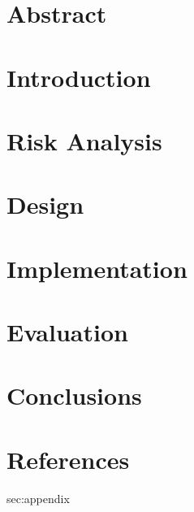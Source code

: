 \documentclass[11pt]{article}
\begin{document}

\clearpage

\onehalfspacing{}

\section*{Abstract}
\label{sec:abstract}

\clearpage

\tableofcontents
\clearpage

\section{Introduction}
\label{sec:intro}


\section{Risk Analysis}
\label{sec:risk}


\clearpage
\section{Design}
\label{sec:design}


\clearpage
\section{Implementation}
\label{sec:impl}


\clearpage
\section{Evaluation}
\label{sec:eval}


\clearpage
\section{Conclusions}
\label{sec:conclusions}


\newpage
\section{References}
\begingroup
\renewcommand{\section}[2]{}%

\endgroup

\newpage
\section{Appendix}
\label{sec:appendix}

\end{document}
